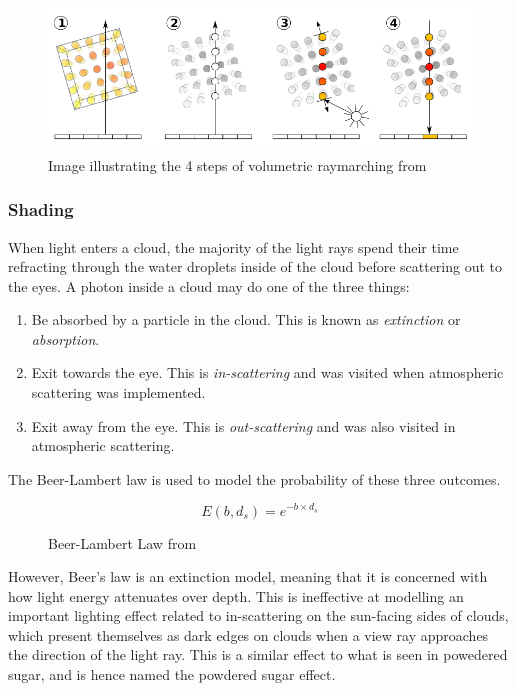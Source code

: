 \documentclass[10pt, openany]{book}
\begin{document}
\begin{figure}[H]
	\centering
	\includegraphics[width=.7\linewidth]{volumetric-raymarching}
	\caption{Image illustrating the 4 steps of volumetric raymarching from \citep{wikipedia:raymarching}}
\end{figure}

\subsubsection{Shading}

When light enters a cloud, the majority of the light rays spend their time refracting through the water droplets inside of the cloud before scattering out to the eyes. \citep{gpupro7} A photon inside a cloud may do one of the three things:
\begin{enumerate}
	\item Be absorbed by a particle in the cloud. This is known as \textit{extinction} or \textit{absorption}.
	\item Exit towards the eye. This is \textit{in-scattering} and was visited when atmospheric scattering was implemented.
	\item Exit away from the eye. This is \textit{out-scattering} and was also visited in atmospheric scattering.
\end{enumerate}
The Beer-Lambert law is used to model the probability of these three outcomes.

\begin{figure}[H]
	\centering
	\[E(b,d_s) = e^{-b \times d_s}\]
	\caption[Beer-Lambert Law]{Beer-Lambert Law from \citep{volumetric-clouds}}
\end{figure}

However, Beer's law is an extinction model, meaning that it is concerned with how light energy attenuates over depth. This is ineffective at modelling an important lighting effect related to in-scattering on the sun-facing sides of clouds, which present themselves as dark edges on clouds when a view ray approaches the direction of the light ray. This is a similar effect to what is seen in powedered sugar, and is hence named the powdered sugar effect. \citep{gpupro7}
\end{document}
